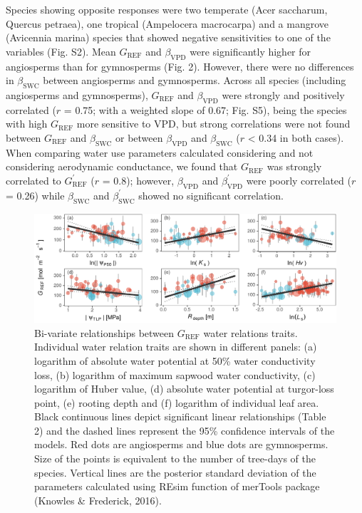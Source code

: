 \documentclass[11pt,twoside]{reedthesis}
\begin{document}
Species showing opposite responses were two temperate (Acer saccharum,
Quercus petraea), one tropical (Ampelocera macrocarpa) and a mangrove
(Avicennia marina) species that showed negative sensitivities to one of
the variables (Fig. S2). Mean \(G_{\text{REF}}\) and
\(\beta_{\text{VPD}}\) were significantly higher for angiosperms than
for gymnosperms (Fig. 2). However, there were no differences in
\(\beta_{\text{SWC}}\) between angiosperms and gymnosperms. Across all
species (including angiosperms and gymnosperms), \(G_{\text{REF}}\) and
\(\beta_{\text{VPD}}\) were strongly and positively correlated (\(r\) =
0.75; with a weighted slope of 0.67; Fig. S5), being the species with
high \(G_{\text{REF}}\) more sensitive to VPD, but strong correlations
were not found between \(G_{\text{REF}}\) and \(\beta_{\text{SWC}}\) or
between \(\beta_{\text{VPD}}\) and \(\beta_{\text{SWC}}\)
(\textbar{}\(r\)\textbar{} \textless{} 0.34 in both cases). When
comparing water use parameters calculated considering and not
considering aerodynamic conductance, we found that \(G_{\text{REF}}\)
was strongly correlated to \(G_{\text{REF}}^{'}\) (\(r\) = 0.8);
however, \(\beta_{\text{VPD}}\) and \(\beta_{\text{VPD}}^{'}\) were
poorly correlated (\(r\) = 0.26) while \(\beta_{\text{SWC}}\) and
\(\beta_{\text{SWC}}^{'}\) showed no significant correlation.\par
\begin{figure}[H]

{\centering \includegraphics[width=1\linewidth]{figure/CH5/Figure_3} 

}

\caption[Bi-variate relationships between $G_{\text{REF}}$ water relations traits.]{Bi-variate relationships between $G_{\text{REF}}$ water relations traits. Individual water relation traits are shown in different panels: (a) logarithm of absolute water potential at 50\% water conductivity loss, (b) logarithm of maximum sapwood water conductivity, (c) logarithm of Huber value, (d) absolute water potential at turgor-loss point, (e) rooting depth and (f) logarithm of individual leaf area. Black continuous lines depict significant linear relationships (Table 2) and the dashed lines represent the 95\% confidence intervals of the models. Red dots are angiosperms and blue dots are gymnosperms. Size of the points is equivalent to the number of tree-days of the species. Vertical lines are the posterior standard deviation of the parameters calculated using REsim function of merTools package (Knowles \& Frederick, 2016).}\label{fig:ch5fig3}
\end{figure}
\end{document}
